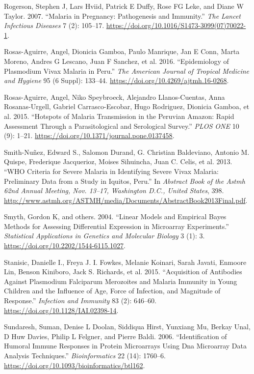 \documentclass[
  a4paper]{article}
\begin{document}
\leavevmode\hypertarget{ref-rogerson2007preg}{}%
Rogerson, Stephen J, Lars Hviid, Patrick E Duffy, Rose FG Leke, and
Diane W Taylor. 2007. ``Malaria in Pregnancy: Pathogenesis and
Immunity.'' \emph{The Lancet Infectious Diseases} 7 (2): 105--17.
\url{https://doi.org/10.1016/S1473-3099(07)70022-1}.

\leavevmode\hypertarget{ref-rosas2016peru}{}%
Rosas-Aguirre, Angel, Dionicia Gamboa, Paulo Manrique, Jan E Conn, Marta
Moreno, Andres G Lescano, Juan F Sanchez, et al. 2016. ``Epidemiology of
Plasmodium Vivax Malaria in Peru.'' \emph{The American Journal of
Tropical Medicine and Hygiene} 95 (6 Suppl): 133--44.
\url{https://doi.org/10.4269/ajtmh.16-0268}.

\leavevmode\hypertarget{ref-hotspots2015}{}%
Rosas-Aguirre, Angel, Niko Speybroeck, Alejandro Llanos-Cuentas, Anna
Rosanas-Urgell, Gabriel Carrasco-Escobar, Hugo Rodriguez, Dionicia
Gamboa, et al. 2015. ``Hotspots of Malaria Transmission in the Peruvian
Amazon: Rapid Assessment Through a Parasitological and Serological
Survey.'' \emph{PLOS ONE} 10 (9): 1--21.
\url{https://doi.org/10.1371/journal.pone.0137458}.

\leavevmode\hypertarget{ref-smith2013}{}%
Smith-Nuñez, Edward S., Salomon Durand, G. Christian Baldeviano, Antonio
M. Quispe, Frederique Jacquerioz, Moises Sihuincha, Juan C. Celis, et
al. 2013. ``WHO Criteria for Severe Malaria in Identifying Severe Vivax
Malaria: Preliminary Data from a Study in Iquitos, Peru.'' In
\emph{Abstract Book of the Astmh 62nd Annual Meeting, Nov. 13--17,
Washington D.C., United States}, 398.
\url{http://www.astmh.org/ASTMH/media/Documents/AbstractBook2013Final.pdf}.

\leavevmode\hypertarget{ref-smyth2004ebayes}{}%
Smyth, Gordon K, and others. 2004. ``Linear Models and Empirical Bayes
Methods for Assessing Differential Expression in Microarray
Experiments.'' \emph{Statistical Applications in Genetics and Molecular
Biology} 3 (1): 3. \url{https://doi.org/10.2202/1544-6115.1027}.

\leavevmode\hypertarget{ref-Stanisic2015}{}%
Stanisic, Danielle I., Freya J. I. Fowkes, Melanie Koinari, Sarah
Javati, Enmoore Lin, Benson Kiniboro, Jack S. Richards, et al. 2015.
``Acquisition of Antibodies Against Plasmodium Falciparum Merozoites and
Malaria Immunity in Young Children and the Influence of Age, Force of
Infection, and Magnitude of Response.'' \emph{Infection and Immunity} 83
(2): 646--60. \url{https://doi.org/10.1128/IAI.02398-14}.

\leavevmode\hypertarget{ref-sundaresh2006}{}%
Sundaresh, Suman, Denise L Doolan, Siddiqua Hirst, Yunxiang Mu, Berkay
Unal, D Huw Davies, Philip L Felgner, and Pierre Baldi. 2006.
``Identification of Humoral Immune Responses in Protein Microarrays
Using Dna Microarray Data Analysis Techniques.'' \emph{Bioinformatics}
22 (14): 1760--6. \url{https://doi.org/10.1093/bioinformatics/btl162}.
\end{document}
